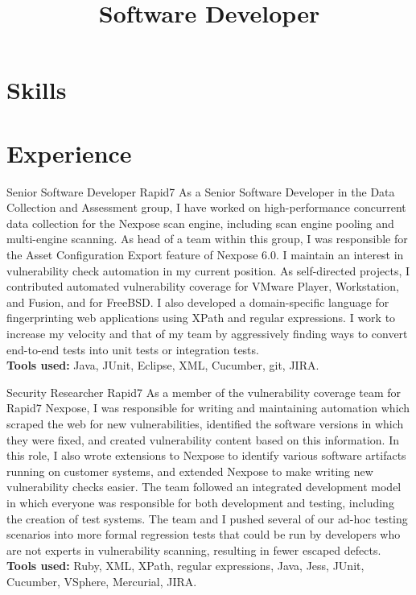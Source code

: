 \documentclass[11pt,letterpaper]{moderncv}
\title{Software Developer}
\begin{document}
\maketitle

\section{Skills}


\section{Experience}

{Senior Software Developer}
{Rapid7}
{}{}
{
As a Senior Software Developer in the Data Collection and Assessment group, I have worked on high-performance concurrent data collection for the Nexpose scan engine, including scan engine pooling and multi-engine scanning. As head of a team within this group, I was responsible for the Asset Configuration Export feature of Nexpose 6.0. I maintain an interest in vulnerability check automation in my current position. As self-directed projects, I contributed automated vulnerability coverage for VMware Player, Workstation, and Fusion, and for FreeBSD. I also developed a domain-specific language for fingerprinting web applications using XPath and regular expressions. I work to increase my velocity and that of my team by aggressively finding ways to convert end-to-end tests into unit tests or integration tests. \\
\textbf{Tools used:} Java, JUnit, Eclipse, XML, Cucumber, git, JIRA.
}

\vspace*{0.2\baselineskip}
{Security Researcher}
{Rapid7}
{}{}
{
As a member of the vulnerability coverage team for Rapid7 Nexpose, I was responsible for writing and maintaining automation which scraped the web for new vulnerabilities, identified the software versions in which they were fixed, and created vulnerability content based on this information. In this role, I also wrote extensions to Nexpose to identify various software artifacts running on customer systems, and extended Nexpose to make writing new vulnerability checks easier. The team followed an integrated development model in which everyone was responsible for both development and testing, including the creation of test systems. The team and I pushed several of our ad-hoc testing scenarios into more formal regression tests that could be run by developers who are not experts in vulnerability scanning, resulting in fewer escaped defects. \\
\textbf{Tools used:} Ruby, XML, XPath, regular expressions, Java, Jess, JUnit, Cucumber, VSphere, Mercurial, JIRA.
}
\end{document}
